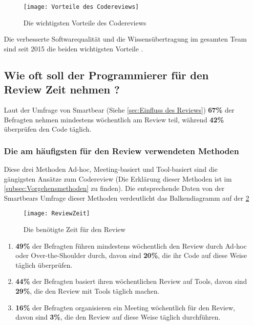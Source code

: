 \begin{figure}[H]
	\centering
	\texttt{[image: Vorteile des Codereviews]}
	\caption[Vorteile des Codereviews]{Die wichtigsten Vorteile des Codereviews\\ \cite{smartbear}}
	\label{fig:Vorteile des Codereviews}
\end{figure}

Die verbesserte Softwarequalität und die Wissensübertragung im gesamten Team sind seit 2015 die beiden wichtigsten Vorteile \cite{smartbear}.

\subsection{Wie oft soll der Programmierer für den Review Zeit nehmen ?}
\label{subsec:reviewerZeit}

Laut der Umfrage von Smartbear (Siehe \cref{sec:Einfluss des Reviews}) \textbf{67\%} der Befragten nehmen mindestens wöchentlich am Review teil, während \textbf{42\%} überprüfen den Code täglich.

\subsubsection{Die am häufigsten für den Review verwendeten Methoden}
\label{subsubsec:Die am häufigsten verwendete Methoden}

Diese drei Methoden Ad-hoc, Meeting-basiert und Tool-basiert sind die gängigsten Ansätze zum Codereview (Die Erklärung dieser Methoden ist im \cref{subsec:Vorgehensmethoden} zu finden).
Die entsprechende Daten von der Smartbears Umfrage \cite{smartbear} dieser Methoden verdeutlicht das Balkendiagramm auf der \cref{fig:ReviewZeit} 

\begin{figure}[H]
	\centering
	\texttt{[image: ReviewZeit]}
	\caption[Reviews Zeit]{Die benötigte Zeit für den Review\\ \cite{smartbear}}
	\label{fig:ReviewZeit}
\end{figure}

\begin{enumerate}
	\item \textbf{49\%} der Befragten führen mindestens wöchentlich den Review durch Ad-hoc oder Over-the-Shoulder durch, davon sind \textbf{20\%}, die ihr Code auf diese Weise 					täglich überprüfen.
	\item \textbf{44\%} der Befragten basiert ihren wöchentlichen Review auf Tools, davon sind \textbf{29\%}, die den Review mit Tools täglich machen.
	\item \textbf{16\%} der Befragten organisieren ein Meeting wöchentlich für den Review, davon sind \textbf{3\%}, die den Review auf diese Weise täglich durchführen.
\end{enumerate}


